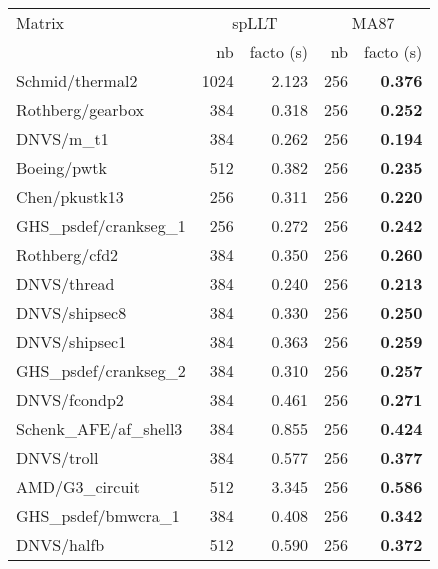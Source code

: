 \begin{tabular}{l|rr|rr}
  \hline
  Matrix                          & \multicolumn{2}{c}{spLLT} & \multicolumn{2}{c}{MA87}     \\
  \cline{2-5}
                                  & nb                        & facto (s) & nb  & facto (s)  \\
  \hline
  Schmid/thermal2                 & 1024                      & 2.123     & 256 & \bf 0.376  \\
  Rothberg/gearbox                & 384                       & 0.318     & 256 & \bf 0.252  \\
  DNVS/m\_t1                      & 384                       & 0.262     & 256 & \bf 0.194  \\
  Boeing/pwtk                     & 512                       & 0.382     & 256 & \bf 0.235  \\
  Chen/pkustk13                   & 256                       & 0.311     & 256 & \bf 0.220  \\
  GHS\_psdef/crankseg\_1          & 256                       & 0.272     & 256 & \bf 0.242  \\
  Rothberg/cfd2                   & 384                       & 0.350     & 256 & \bf 0.260  \\
  DNVS/thread                     & 384                       & 0.240     & 256 & \bf 0.213  \\
  DNVS/shipsec8                   & 384                       & 0.330     & 256 & \bf 0.250  \\
  DNVS/shipsec1                   & 384                       & 0.363     & 256 & \bf 0.259  \\
  GHS\_psdef/crankseg\_2          & 384                       & 0.310     & 256 & \bf 0.257  \\
  DNVS/fcondp2                    & 384                       & 0.461     & 256 & \bf 0.271  \\
  Schenk\_AFE/af\_shell3          & 384                       & 0.855     & 256 & \bf 0.424  \\
  DNVS/troll                      & 384                       & 0.577     & 256 & \bf 0.377  \\
  AMD/G3\_circuit                 & 512                       & 3.345     & 256 & \bf 0.586  \\
  GHS\_psdef/bmwcra\_1            & 384                       & 0.408     & 256 & \bf 0.342  \\
  DNVS/halfb                      & 512                       & 0.590     & 256 & \bf 0.372  \\

\end{tabular}
